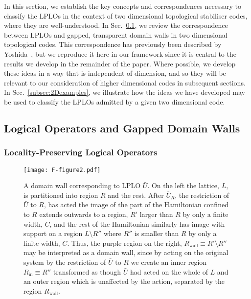 \documentclass[pra,twocolumn,a4paper,nofootinbib]{revtex4-1}
\begin{document}
In this section, we establish the key concepts and correspondences necessary to classify the LPLOs in the context of two dimensional topological stabiliser codes, where they are well-understood. In Sec.~\ref{subsec:2DLPLO}, we review the correspondence between LPLOs and gapped, transparent domain walls in two dimensional topological codes. This correspondence has previously been described by Yoshida~\cite{YoshidaA}, but we reproduce it here in our framework since it is central to the results we develop in the remainder of the paper. Where possible, we develop these ideas in a way that is independent of dimension, and so they will be relevant to our consideration of higher dimensional codes in subsequent sections.  In Sec.~\ref{subsec:2Dexamples}, we illustrate how the ideas we have developed may be used to classify the LPLOs admitted by a given two dimensional code. 

\subsection{Logical Operators and Gapped Domain Walls}
\label{subsec:2DLPLO}

\subsubsection{Locality-Preserving Logical Operators}

\begin{figure}
\centering
\texttt{[image: F-figure2.pdf]}
\caption{A domain wall corresponding to LPLO $\bar{U}$. On the left the lattice, $L$, is partitioned into region $R$ and the rest. After $\bar{U}_R$, the restriction of $\bar{U}$ to $R$, has acted the image of the part of the Hamiltonian confined to $R$ extends outwards to a region, $R'$ larger than $R$ by only a finite width, $C$, and the rest of the Hamiltonian similarly has image with support on a region $L \setminus R''$ where $R''$ is smaller than $R$ by only a finite width, $C$. Thus, the purple region on the right, ${R}_{\text{wall}} \equiv R'\setminus R''$ may be interpreted as a domain wall, since by acting on the original system by the restriction of $\bar{U}$ to $R$ we create an inner region ${R}_{\text{in}}\equiv R''$ transformed as though $\bar{U}$ had acted on the whole of $L$ and an outer region which is unaffected by the action, separated by the region ${R}_{\text{wall}}$.}
\label{fig:corresp}
\end{figure}
\end{document}
